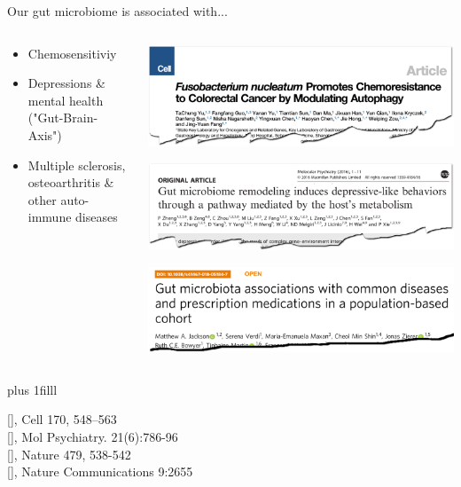 \documentclass[10pt]{beamer}
\newcommand{\credit}[1]{{\vskip0pt plus 1filll \par \raggedleft \scriptsize \mdseries \color{mDarkBrown} #1 \par}}
\newcommand{\citeme}[1]{{\xspace\color{scAqua} \scriptsize [\cite{#1}]}}
\begin{document}
\begin{frame}{Our gut microbiome is associated with...}
	\begin{columns}
		\begin{column}{0.4\textwidth}
			\begin{itemize}
				\item Chemosensitiviy
				\item Depressions \& mental health ("Gut-Brain-Axis")
				\item Multiple sclerosis, osteoarthritis  \& other auto-immune diseases
			\end{itemize}
		\end{column}
		\begin{column}{0.7\textwidth}
			\begin{center}
				\includegraphics[width=\textwidth]{./figures/microbiome-chemoresistance.png}\par
				\includegraphics[width=\textwidth]{./figures/gutbrainaxis-2-zhang.png}\par
				\includegraphics[width=\textwidth]{./figures/paper-jackson.png}
			\end{center}
		\end{column}
	\end{columns}
	\credit{
		\citeme{Yu2017}, Cell 170, 548–563 \\
		\citeme{Zheng2016}, Mol Psychiatry. 21(6):786-96 \\
		\citeme{Berer2011}, Nature 479, 538-542 \\
		\citeme{Jackson2018}, Nature Communications 9:2655}
\end{frame}
\end{document}

